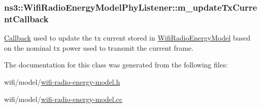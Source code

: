 \subsubsection[{\texorpdfstring{m\+\_\+update\+Tx\+Current\+Callback}{m_updateTxCurrentCallback}}]{ ns3\+::\+Wifi\+Radio\+Energy\+Model\+Phy\+Listener\+::m\+\_\+update\+Tx\+Current\+Callback\hspace{0.3cm}{\ttfamily [private]}}\hypertarget{classns3_1_1WifiRadioEnergyModelPhyListener_a718497ae1babeb0343b4c4ec4122be85}{}\label{classns3_1_1WifiRadioEnergyModelPhyListener_a718497ae1babeb0343b4c4ec4122be85}
\hyperlink{classns3_1_1Callback}{Callback} used to update the tx current stored in \hyperlink{classns3_1_1WifiRadioEnergyModel}{Wifi\+Radio\+Energy\+Model} based on the nominal tx power used to transmit the current frame. 

The documentation for this class was generated from the following files\+:\begin{DoxyCompactItemize}
\item 
wifi/model/\hyperlink{wifi-radio-energy-model_8h}{wifi-\/radio-\/energy-\/model.\+h}\item 
wifi/model/\hyperlink{wifi-radio-energy-model_8cc}{wifi-\/radio-\/energy-\/model.\+cc}\end{DoxyCompactItemize}
